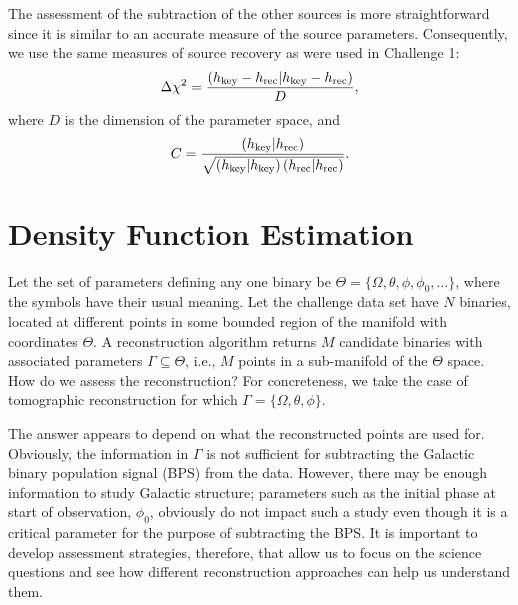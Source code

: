 \documentclass[11pt]{article}
\begin{document}
The assessment of the subtraction of the other sources is more straightforward since it is similar to an accurate measure of the source parameters. Consequently, we use the same measures of source recovery as were used in Challenge 1:
\begin{equation}
\label{deltachi}
\Delta \chi^2 = \frac{\left(h_{\rm key} - h_{\rm rec}|h_{\rm key} - h_{\rm rec}\right)}{D},
\end{equation}
where $D$ is the dimension of the parameter space, and
\begin{equation}
\label{cor}
C = \frac{\left(h_{\rm key}|h_{\rm rec}\right)}{\sqrt{\left(h_{\rm key}|h_{\rm key}\right)\left(h_{\rm rec}|h_{\rm rec}\right)}}.
\end{equation}

\section{Density Function Estimation \label{density}}
Let the set of parameters defining any one binary be $\Theta = \{\Omega,\theta,\phi,\phi_0,\ldots\}$, where the symbols have their usual
meaning. Let the challenge data set have $N$ binaries, located at different points in some bounded region of the manifold with coordinates
 $\Theta$.
A reconstruction algorithm returns $M$ candidate binaries with associated parameters $\Gamma \subseteq
\Theta$, i.e., $M$ points in a sub-manifold of the $\Theta$ space. How do we assess the reconstruction? For concreteness, we take the case of tomographic reconstruction for which $\Gamma = \{\Omega, \theta, \phi\}$. 

The answer appears to depend on what the reconstructed points are used for. Obviously, the information in $\Gamma$ is not sufficient for subtracting the Galactic binary population signal (BPS) 
from the data. However, there may be enough information to study Galactic structure; 
parameters such as the initial phase at start of observation, $\phi_0$, obviously do not impact such a study even though it is a critical parameter for the purpose of subtracting the BPS. It is important to develop assessment strategies, therefore, that allow us to focus on the science questions and see how different reconstruction approaches can help us understand them.
\end{document}
